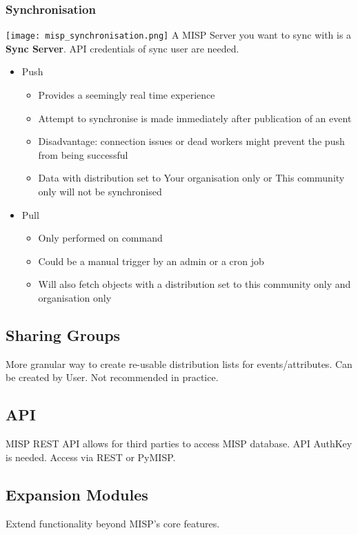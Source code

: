 \subsubsection{Synchronisation}
\texttt{[image: misp\_synchronisation.png]}
A MISP Server you want to sync with is a \textbf{Sync Server}. API credentials of sync user are needed.
\begin{itemize}
    \item Push
    \begin{itemize}
        \item Provides a seemingly real time experience
        \item Attempt to synchronise is made immediately after publication of an event
        \item Disadvantage: connection issues or dead workers might prevent the push from being successful
        \item Data with distribution set to Your organisation only or This community only will not be synchronised
    \end{itemize}
    \item Pull
    \begin{itemize}
        \item Only performed on command
        \item Could be a manual trigger by an admin or a cron job
        \item Will also fetch objects with a distribution set to this community only and organisation only
       
    \end{itemize}
\end{itemize}
\subsection{Sharing Groups}
More granular way to create re-usable distribution lists for events/attributes. Can be created by User. Not recommended in practice.

\subsection{API}
MISP REST API allows for third parties to access MISP database. API AuthKey is needed. Access via REST or PyMISP.
\subsection{Expansion Modules}
Extend functionality beyond MISP’s core features. 

